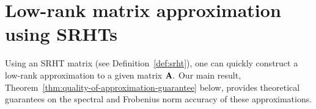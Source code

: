 \section{Low-rank matrix approximation using SRHTs}\label{sec:lowrank}
Using an SRHT matrix (see Definition~\ref{def:srht}),
one can quickly construct a low-rank approximation to a given matrix ${\bm{\mathrm{A}}}.$
Our main result, Theorem~\ref{thm:quality-of-approximation-guarantee} below, provides theoretical guarantees on the spectral and Frobenius norm accuracy of these approximations.

